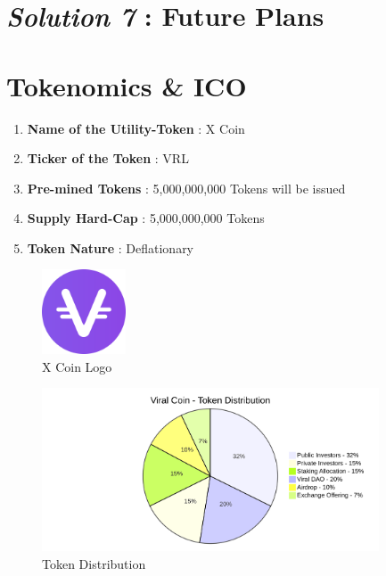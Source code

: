 \documentclass[letterpaper,11pt]{article}
\begin{document}
\section{\textbf{\textit{Solution 7} : Future Plans}}

\section{\textbf{Tokenomics \& ICO}}

\begin{enumerate}[wide, labelwidth=!, labelindent=0pt]
\item \textbf{Name of the Utility-Token} : X Coin
\item \textbf{Ticker of the Token} : VRL
\item \textbf{Pre-mined Tokens} : 5,000,000,000 Tokens will be issued 
\item \textbf{Supply Hard-Cap} : 5,000,000,000 Tokens
\item \textbf{Token Nature} : Deflationary
\end{enumerate}

\begin{figure}[H]
\begin{center}
\includegraphics[width=2.5cm]{x-coin-logo}
\caption{X Coin Logo}
\end{center}
\end{figure}

\begin{figure}[H]
\begin{center}
\includegraphics[width=10cm]{token-distribution}
\caption{Token Distribution}
\end{center}
\end{figure}
\end{document}
